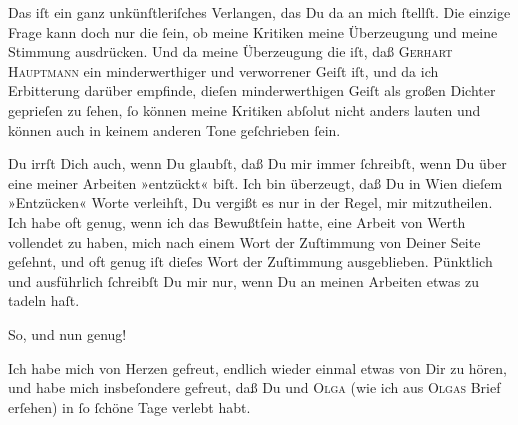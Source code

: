                Das iſt \strikeout{\textcolor{gray}{doch}} ein ganz unkünſtleriſches Verlangen, das Du da an mich ſtellſt. Die einzige
               Frage kann doch nur die ſein, ob meine Kritiken meine Überzeugung und meine Stimmung
               ausdrücken. Und da meine Überzeugung die iſt, daß \textsc{Gerhart Hauptmann} ein minderwerthiger {\pb}und verworrener Geiſt
               iſt, und da ich Erbitterung darüber empfinde, dieſen minderwerthigen Geiſt als großen Dichter
               geprieſen zu ſehen, ſo \strikeout{\textcolor{gray}{ſ}} können meine Kritiken abſolut nicht anders lauten und können auch in keinem
               anderen Tone geſchrieben ſein.\pend
           
\pstart
           Du irrſt Dich auch, wenn Du glaubſt, daß Du mir immer ſchreibſt, wenn Du über eine
               meiner Arbeiten »entzückt« biſt. Ich bin überzeugt, daß Du in Wien dieſem »Entzücken« Worte verleihſt, Du vergißt es nur in
               der {\pb}Regel, mir mitzutheilen. Ich habe oft genug, wenn
               ich das Bewußtſein hatte, eine Arbeit von Werth vollendet zu haben, mich nach einem
               Wort der Zuſtimmung von Deiner Seite geſehnt, und oft genug iſt dieſes Wort der
               Zuſtimmung ausgeblieben. Pünktlich und ausführlich ſchreibſt Du mir nur, wenn Du an
               meinen Arbeiten etwas zu tadeln haſt.\pend
           
\pstart
           So, und nun genug!\pend
           
\pstart
           Ich habe mich von Herzen gefreut, endlich wieder einmal etwas von Dir zu hören, und
               habe mich insbeſondere gefreut, {\pb}daß Du und \textsc{Olga} (wie ich aus \textsc{Olgas} Brief erſehen) in \label{K_L03091-4v}\label{K_L03091-4} ſo ſchöne Tage
               verlebt habt.\pend
           
